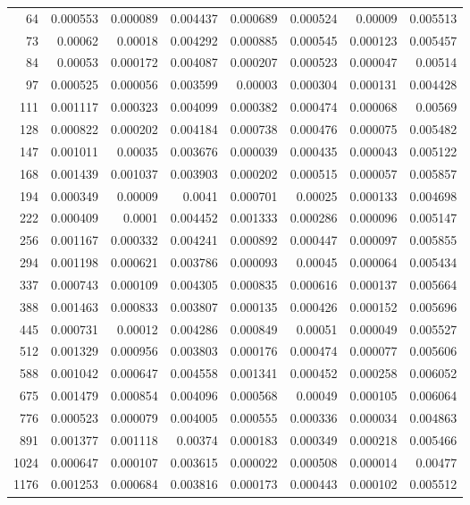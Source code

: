 \begin{longtable}{r r r r r r r r}
64 & 0.000553 & 0.000089 & 0.004437 & 0.000689 & 0.000524 & 0.00009 & 0.005513 \\
73 & 0.00062 & 0.00018 & 0.004292 & 0.000885 & 0.000545 & 0.000123 & 0.005457 \\
84 & 0.00053 & 0.000172 & 0.004087 & 0.000207 & 0.000523 & 0.000047 & 0.00514 \\
97 & 0.000525 & 0.000056 & 0.003599 & 0.00003 & 0.000304 & 0.000131 & 0.004428 \\
111 & 0.001117 & 0.000323 & 0.004099 & 0.000382 & 0.000474 & 0.000068 & 0.00569 \\
128 & 0.000822 & 0.000202 & 0.004184 & 0.000738 & 0.000476 & 0.000075 & 0.005482 \\
147 & 0.001011 & 0.00035 & 0.003676 & 0.000039 & 0.000435 & 0.000043 & 0.005122 \\
168 & 0.001439 & 0.001037 & 0.003903 & 0.000202 & 0.000515 & 0.000057 & 0.005857 \\
194 & 0.000349 & 0.00009 & 0.0041 & 0.000701 & 0.00025 & 0.000133 & 0.004698 \\
222 & 0.000409 & 0.0001 & 0.004452 & 0.001333 & 0.000286 & 0.000096 & 0.005147 \\
256 & 0.001167 & 0.000332 & 0.004241 & 0.000892 & 0.000447 & 0.000097 & 0.005855 \\
294 & 0.001198 & 0.000621 & 0.003786 & 0.000093 & 0.00045 & 0.000064 & 0.005434 \\
337 & 0.000743 & 0.000109 & 0.004305 & 0.000835 & 0.000616 & 0.000137 & 0.005664 \\
388 & 0.001463 & 0.000833 & 0.003807 & 0.000135 & 0.000426 & 0.000152 & 0.005696 \\
445 & 0.000731 & 0.00012 & 0.004286 & 0.000849 & 0.00051 & 0.000049 & 0.005527 \\
512 & 0.001329 & 0.000956 & 0.003803 & 0.000176 & 0.000474 & 0.000077 & 0.005606 \\
588 & 0.001042 & 0.000647 & 0.004558 & 0.001341 & 0.000452 & 0.000258 & 0.006052 \\
675 & 0.001479 & 0.000854 & 0.004096 & 0.000568 & 0.00049 & 0.000105 & 0.006064 \\
776 & 0.000523 & 0.000079 & 0.004005 & 0.000555 & 0.000336 & 0.000034 & 0.004863 \\
891 & 0.001377 & 0.001118 & 0.00374 & 0.000183 & 0.000349 & 0.000218 & 0.005466 \\
1024 & 0.000647 & 0.000107 & 0.003615 & 0.000022 & 0.000508 & 0.000014 & 0.00477 \\
1176 & 0.001253 & 0.000684 & 0.003816 & 0.000173 & 0.000443 & 0.000102 & 0.005512 \\

\end{longtable}
